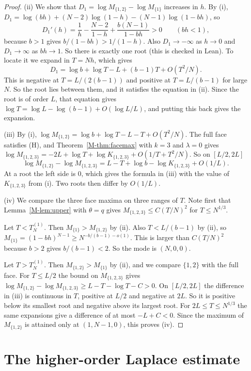 \documentclass[EJP,preprint]{ejpecp}
\newcommand{\mref}[1]{\ref*{M-#1}}
\begin{document}
\begin{proof}
(ii) We show that $D_1=\log M_{\{1,2\}}-\log M_{\{1\}}$ increases in $h$. By (i),
$D_1=\log(bh)+(N-2)\log(1-h)-(N-1)\log(1-bh)$, so
\[
D_1'(h)=\frac1h-\frac{N-2}{1-h}+\frac{b(N-1)}{1-bh}>0\qquad(bh<1),
\]
because $b>1$ gives $b/(1-bh)>1/(1-h)$. Also $D_1\to-\infty$ as $h\to0$ and $D_1\to\infty$ as
$bh\to1$. So there is exactly one root (this is checked in Lean). To locate it we expand in
$T=Nh$, which gives
\[
D_1=\log b+\log T-L+(b-1)T+O(T^2/N).
\]
This is negative at $T=L/(2(b-1))$ and positive at $T=L/(b-1)$ for large $N$. So the root lies
between them, and it satisfies the equation in (ii). Since the root is of order $L$, that
equation gives $\log T=\log L-\log(b-1)+O(\log L/L)$, and putting this back gives the expansion.

(iii) By (i), $\log M_{\{1,2\}}=\log b+\log T-L-T+O(T^2/N)$. The full face satisfies (H), and
Theorem~\mref{thm:facemax} with $k=3$ and $\lambda=0$ gives
$\log M_{\{1,2,3\}}=-2L+\log T+\log K_{\{1,2,3\}}+O(1/T+T^2/N)$. So on $[L/2,2L]$
\[
\log M_{\{1,2\}}-\log M_{\{1,2,3\}}=L-T+\log b-\log K_{\{1,2,3\}}+O(1/L).
\]
At a root the left side is $0$, which gives the formula in (iii) with the value of
$K_{\{1,2,3\}}$ from (i). Two roots then differ by $O(1/L)$.

(iv) We compare the three face maxima on three ranges of $T$. Note first that
Lemma~\mref{lem:upper} with $\theta=q$ gives $M_{\{1,2,3\}}\le C(T/N)^2$ for $T\le N^{1/3}$.

Let $T<T^{(1)}_N$. Then $M_{\{1\}}>M_{\{1,2\}}$ by (ii). Also $T<L/(b-1)$ by (ii), so
$M_{\{1\}}=(1-bh)^{N-1}\ge N^{-b/(b-1)-o(1)}$. This is larger than $C(T/N)^2$ because
$b>2$ gives $b/(b-1)<2$. So the mode is $(N,0,0)$.

Let $T>T^{(1)}_N$. Then $M_{\{1,2\}}>M_{\{1\}}$ by (ii), and we compare $\{1,2\}$ with the full
face. For $T\le L/2$ the bound on $M_{\{1,2,3\}}$ gives
$\log M_{\{1,2\}}-\log M_{\{1,2,3\}}\ge L-T-\log T-C>0$. On $[L/2,2L]$ the
difference in (iii) is continuous in $T$, positive at $L/2$ and negative at
$2L$. So it is positive below its smallest root and negative above its largest root. For
$2L\le T\le N^{1/3}$ the same expansions give a difference of at most $-L+C<0$. Since the
maximum of $M_{\{1,2\}}$ is attained only at $(1,N-1,0)$, this proves (iv).
\end{proof}




\section{The higher-order Laplace estimate}\label{supp:laplace-next}
\end{document}
